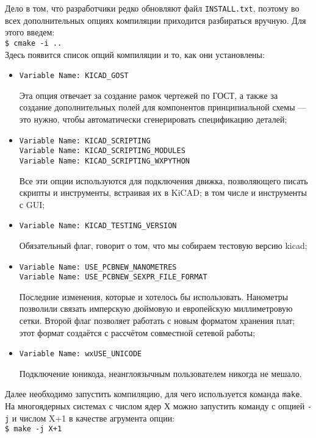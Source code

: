 Дело в том, что разработчики редко обновляют файл \texttt{INSTALL.txt}, поэтому во всех дополнительных опциях компиляции приходится разбираться вручную. Для этого введем:\\
\texttt{\$ cmake -i ..}\\
Здесь появится список опций компиляции и то, как они установлены:
\begin{itemize}
 \item \texttt{Variable Name: KICAD\_GOST}

       Эта опция отвечает за создание рамок чертежей по ГОСТ, а также за создание дополнительных полей для компонентов принципиальной схемы --- это нужно, чтобы автоматически сгенерировать спецификацию деталей;
 \item \texttt{Variable Name: KICAD\_SCRIPTING}\\
       \texttt{Variable Name: KICAD\_SCRIPTING\_MODULES}\\
       \texttt{Variable Name: KICAD\_SCRIPTING\_WXPYTHON}

       Все эти опции используются для подключения движка, позволяющего писать скрипты и инструменты, встраивая их в KiCAD; в том числе и инструменты с GUI;
 \item \texttt{Variable Name: KICAD\_TESTING\_VERSION}

       Обязательный флаг, говорит о том, что мы собираем тестовую версию kicad;
 \item \texttt{Variable Name: USE\_PCBNEW\_NANOMETRES}\\
       \texttt{Variable Name: USE\_PCBNEW\_SEXPR\_FILE\_FORMAT}

       Последние изменения, которые и хотелось бы использовать. Нанометры позволили связать имперскую дюймовую и европейскую миллиметровую сетки. Второй флаг позволяет работать с новым форматом хранения плат; этот формат создаётся с рассчётом совместной сетевой работы;
 \item \texttt{Variable Name: wxUSE\_UNICODE}

       Подключение юникода, неанглоязычным пользователем никогда не мешало.
\end{itemize}

Далее необходимо запустить компиляцию, для чего используется команда \texttt{make}. На многоядерных системах с числом ядер Х можно запустить команду с опцией \texttt{-j} и числом X+1 в качестве агрумента опции:\\
\texttt{\$ make -j X+1}


